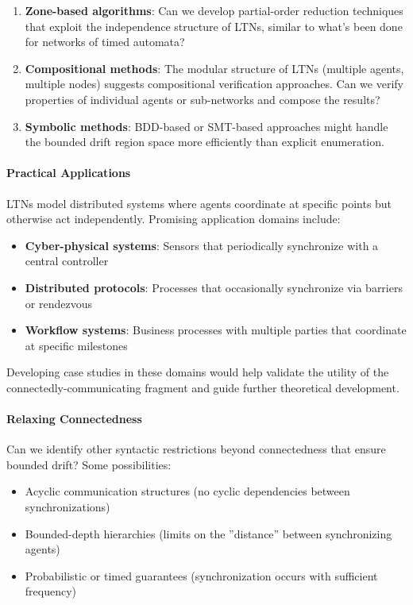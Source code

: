 \begin{enumerate}
\item \textbf{Zone-based algorithms}: Can we develop partial-order reduction techniques that exploit the independence structure of LTNs, similar to what's been done for networks of timed automata?

\item \textbf{Compositional methods}: The modular structure of LTNs (multiple agents, multiple nodes) suggests compositional verification approaches. Can we verify properties of individual agents or sub-networks and compose the results?

\item \textbf{Symbolic methods}: BDD-based or SMT-based approaches might handle the bounded drift region space more efficiently than explicit enumeration.
\end{enumerate}

\paragraph*{Practical Applications}

LTNs model distributed systems where agents coordinate at specific points but otherwise act independently. Promising application domains include:

\begin{itemize}
\item \textbf{Cyber-physical systems}: Sensors that periodically synchronize with a central controller
\item \textbf{Distributed protocols}: Processes that occasionally synchronize via barriers or rendezvous
\item \textbf{Workflow systems}: Business processes with multiple parties that coordinate at specific milestones
\end{itemize}

Developing case studies in these domains would help validate the utility of the connectedly-communicating fragment and guide further theoretical development.

\paragraph*{Relaxing Connectedness}

Can we identify other syntactic restrictions beyond connectedness that ensure bounded drift? Some possibilities:

\begin{itemize}
\item Acyclic communication structures (no cyclic dependencies between synchronizations)
\item Bounded-depth hierarchies (limits on the ''distance'' between synchronizing agents)
\item Probabilistic or timed guarantees (synchronization occurs with sufficient frequency)
\end{itemize}

